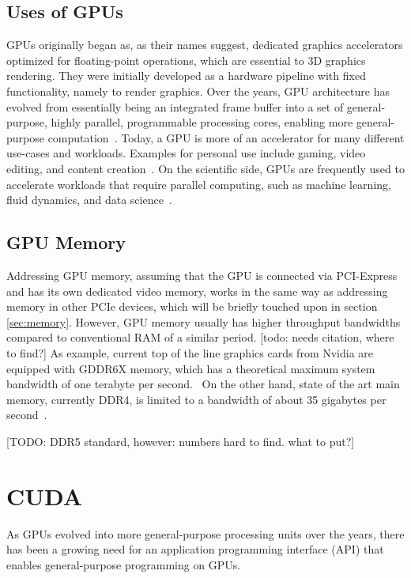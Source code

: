  \subsection{Uses of GPUs}
 
 GPUs originally began as, as their names suggest, dedicated graphics accelerators optimized for floating-point operations, which are essential to 3D graphics rendering. They were initially developed as a hardware pipeline with fixed functionality, namely to render graphics. Over the years, GPU architecture has evolved from essentially being an integrated frame buffer into a set of general-purpose, highly parallel, programmable processing cores, enabling more general-purpose computation~\cite{mcclanahan_history_2010}. Today, a GPU is more of an accelerator for many different use-cases and workloads. Examples for personal use include gaming, video editing, and content creation~\cite{intel_what_2022}. On the scientific side, GPUs are frequently used to accelerate workloads that require parallel computing, such as machine learning, fluid dynamics, and data science~\cite{nvidia_cuda_2017}.
 
 
 \subsection{GPU Memory}
 Addressing GPU memory, assuming that the GPU is connected via PCI-Express and has its own dedicated video memory, works in the same way as addressing memory in other PCIe devices, which will be briefly touched upon in section \ref{sec:memory}. However, GPU memory usually has higher throughput bandwidths compared to conventional RAM of a similar period. [todo: needs citation, where to find?] As example, current top of the line graphics cards from Nvidia are equipped with GDDR6X memory, which has a theoretical maximum system bandwidth of one terabyte per second.~\cite{nvidia_nvidia_2020, micron_technology_inc_gddr6x_2022} On the other hand, state of the art main memory, currently DDR4, is limited to a bandwidth of about 35 gigabytes per second~\cite{micron_technology_inc_ram_2022}.
 
 [TODO: DDR5 standard, however: numbers hard to find. what to put?]
 
 
 \section{CUDA}
 As GPUs evolved into more general-purpose processing units over the years, there has been a growing need for an application programming interface (API) that enables general-purpose programming on GPUs.
 
